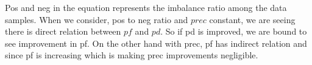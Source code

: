 Pos and neg in the equation represents the imbalance ratio among the data samples. When we consider, pos to neg ratio and $prec$ constant, we are seeing there is direct relation between $pf$ and $pd$. So if pd is improved, we are bound to see improvement in pf. On the other hand with prec, pf has indirect relation and since pf is increasing which is making prec improvements negligible.








